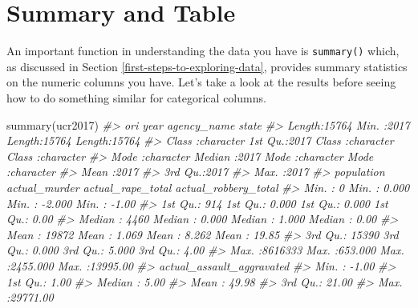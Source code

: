 \documentclass[
  12pt,
]{book}
\newenvironment{Shaded}{\begin{snugshade}}{\end{snugshade}}
\newcommand{\CommentTok}[1]{\textcolor[rgb]{0.37,0.37,0.37}{\textit{#1}}}
\newcommand{\FunctionTok}[1]{\textcolor[rgb]{0,0,0}{#1}}
\newcommand{\NormalTok}[1]{#1}
\begin{document}
\hypertarget{summary-and-table}{%
\section{Summary and Table}\label{summary-and-table}}

An important function in understanding the data you have is \texttt{summary()} which, as discussed in Section \ref{first-steps-to-exploring-data}, provides summary statistics on the numeric columns you have. Let's take a look at the results before seeing how to do something similar for categorical columns.

\begin{Shaded}
\begin{Highlighting}[]
\FunctionTok{summary}\NormalTok{(ucr2017)}
\CommentTok{\#\textgreater{}      ori                 year      agency\_name           state          }
\CommentTok{\#\textgreater{}  Length:15764       Min.   :2017   Length:15764       Length:15764      }
\CommentTok{\#\textgreater{}  Class :character   1st Qu.:2017   Class :character   Class :character  }
\CommentTok{\#\textgreater{}  Mode  :character   Median :2017   Mode  :character   Mode  :character  }
\CommentTok{\#\textgreater{}                     Mean   :2017                                        }
\CommentTok{\#\textgreater{}                     3rd Qu.:2017                                        }
\CommentTok{\#\textgreater{}                     Max.   :2017                                        }
\CommentTok{\#\textgreater{}    population      actual\_murder     actual\_rape\_total  actual\_robbery\_total}
\CommentTok{\#\textgreater{}  Min.   :      0   Min.   :  0.000   Min.   :  {-}2.000   Min.   :   {-}1.00    }
\CommentTok{\#\textgreater{}  1st Qu.:    914   1st Qu.:  0.000   1st Qu.:   0.000   1st Qu.:    0.00    }
\CommentTok{\#\textgreater{}  Median :   4460   Median :  0.000   Median :   1.000   Median :    0.00    }
\CommentTok{\#\textgreater{}  Mean   :  19872   Mean   :  1.069   Mean   :   8.262   Mean   :   19.85    }
\CommentTok{\#\textgreater{}  3rd Qu.:  15390   3rd Qu.:  0.000   3rd Qu.:   5.000   3rd Qu.:    4.00    }
\CommentTok{\#\textgreater{}  Max.   :8616333   Max.   :653.000   Max.   :2455.000   Max.   :13995.00    }
\CommentTok{\#\textgreater{}  actual\_assault\_aggravated}
\CommentTok{\#\textgreater{}  Min.   :   {-}1.00         }
\CommentTok{\#\textgreater{}  1st Qu.:    1.00         }
\CommentTok{\#\textgreater{}  Median :    5.00         }
\CommentTok{\#\textgreater{}  Mean   :   49.98         }
\CommentTok{\#\textgreater{}  3rd Qu.:   21.00         }
\CommentTok{\#\textgreater{}  Max.   :29771.00}
\end{Highlighting}
\end{Shaded}
\end{document}
